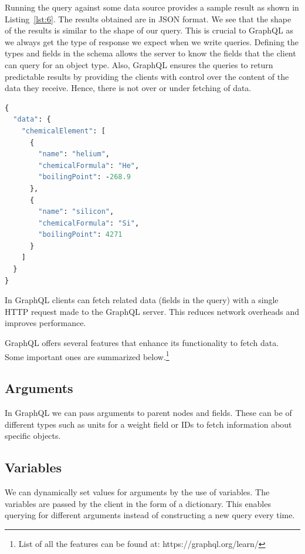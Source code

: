 Running the query against some data source provides a sample result as shown in Listing~\ref{lst:6}. The results obtained are in JSON format. We see that the shape of the results is similar to the shape of our query. This is crucial to GraphQL as we always get the type of response we expect when we write queries. Defining the types and fields in the schema allows the server to know the fields that the client can query for an object type. Also, GraphQL ensures the queries to return predictable results by providing the clients with control over the content of the data they receive. Hence, there is not over or under fetching of data.



\begin{minipage}{\linewidth}
\begin{lstlisting}[label=lst:6, caption={Results of the GraphQL query}, language=GraphQL]
{
  "data": {
    "chemicalElement": [
      {
        "name": "helium",
        "chemicalFormula": "He",
        "boilingPoint": -268.9
      },
      {
        "name": "silicon",
        "chemicalFormula": "Si",
        "boilingPoint": 4271
      }
    ]
  }
}
\end{lstlisting}
\end{minipage}

In GraphQL clients can fetch related data (fields in the query) with a single HTTP request made to the GraphQL server. This reduces network overheads and improves performance.

GraphQL offers several features that enhance its functionality to fetch data. Some important ones are summarized below.\footnote{List of all the features can be found at: https://graphql.org/learn/}

\subsection{Arguments}
In GraphQL we can pass arguments to parent nodes and fields. These can be of different types such as units for a weight field or IDs to fetch information about specific objects.

\subsection{Variables}
We can dynamically set values for arguments by the use of variables. The variables are passed by the client in the form of a dictionary. This enables querying for different arguments instead of constructing a new query every time.

